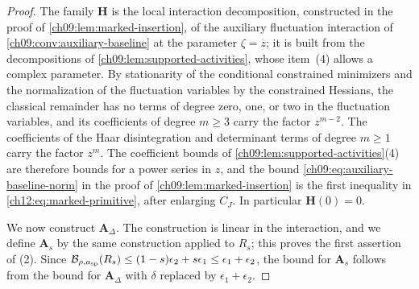 \begin{proof}
The family $\boldsymbol H$ is the local interaction decomposition, constructed in the proof of \cref{ch09:lem:marked-insertion}, of the auxiliary fluctuation interaction of \cref{ch09:conv:auxiliary-baseline} at the parameter $\zeta=z$; it is built from the decompositions of \cref{ch09:lem:supported-activities}, whose item~(4) allows a complex parameter. By stationarity of the conditional constrained minimizers and the normalization of the fluctuation variables by the constrained Hessians, the classical remainder has no terms of degree zero, one, or two in the fluctuation variables, and its coefficients of degree $m\ge3$ carry the factor $z^{m-2}$. The coefficients of the Haar disintegration and determinant terms of degree $m\ge1$ carry the factor $z^m$. The coefficient bounds of \cref{ch09:lem:supported-activities}(4) are therefore bounds for a power series in $z$, and the bound \eqref{ch09:eq:auxiliary-baseline-norm} in the proof of \cref{ch09:lem:marked-insertion} is the first inequality in \eqref{ch12:eq:marked-primitive}, after enlarging $C_J$. In particular $\boldsymbol H(0)=0$.

We now construct $\boldsymbol A_\Delta$. The construction is linear in the interaction, and we define $\boldsymbol A_s$ by the same construction applied to $R_s$; this proves the first assertion of (2). Since $\mathcal B_{\rho,a_{\mathrm{sp}}}(R_s)\le(1-s)\epsilon_2+s\epsilon_1\le\epsilon_1+\epsilon_2$, the bound for $\boldsymbol A_s$ follows from the bound for $\boldsymbol A_\Delta$ with $\delta$ replaced by $\epsilon_1+\epsilon_2$.


\end{proof}
